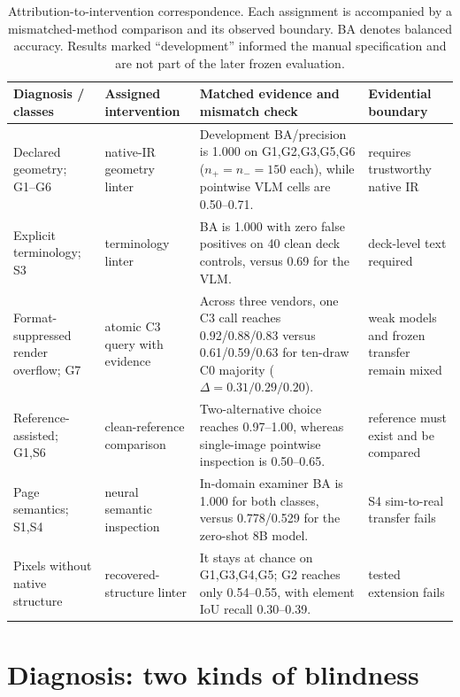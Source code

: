 \documentclass[letterpaper]{article}            %
\newcommand{\g}[1]{\textsf{#1}}        %
\begin{document}
\begin{table}[t]
\centering
\footnotesize
\setlength{\tabcolsep}{4pt}
\renewcommand{\arraystretch}{1.03}
\caption{Attribution-to-intervention correspondence. Each assignment is accompanied by a mismatched-method
comparison and its observed boundary. BA denotes balanced accuracy. Results marked ``development'' informed the
manual specification and are not part of the later frozen evaluation.}
\label{tab:diagnosis-method}
\begin{tabular}{@{}p{}p{}p{}p{}@{}}
\toprule
Diagnosis / classes & Assigned intervention & Matched evidence and mismatch check & Evidential boundary \\
\midrule
Declared geometry; \g{G1--G6} & native-IR geometry linter & Development BA/precision is 1.000 on \g{G1,G2,G3,G5,G6} ($n_+=n_-=150$ each), while pointwise VLM cells are 0.50--0.71. & requires trustworthy native IR \\
Explicit terminology; \g{S3} & terminology linter & BA is 1.000 with zero false positives on 40 clean deck controls, versus 0.69 for the VLM. & deck-level text required \\
Format-suppressed render overflow; \g{G7} & atomic C3 query with evidence & Across three vendors, one C3 call reaches 0.92/0.88/0.83 versus 0.61/0.59/0.63 for ten-draw C0 majority ($\Delta=0.31/0.29/0.20$). & weak models and frozen transfer remain mixed \\
Reference-assisted; \g{G1,S6} & clean-reference comparison & Two-alternative choice reaches 0.97--1.00, whereas single-image pointwise inspection is 0.50--0.65. & reference must exist and be compared \\
Page semantics; \g{S1,S4} & neural semantic inspection & In-domain examiner BA is 1.000 for both classes, versus 0.778/0.529 for the zero-shot 8B model. & \g{S4} sim-to-real transfer fails \\
Pixels without native structure & recovered-structure linter & It stays at chance on \g{G1,G3,G4,G5}; \g{G2} reaches only 0.54--0.55, with element IoU recall 0.30--0.39. & tested extension fails \\
\bottomrule
\end{tabular}
\end{table}

\section{Diagnosis: two kinds of blindness}\label{sec:diag}
\end{document}
